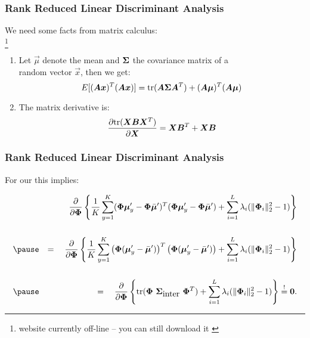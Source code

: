 \begin{frame}
	\frametitle{Rank Reduced Linear Discriminant Analysis \cont}

	We need some facts from matrix calculus: \\
	\point {}%
	\footnote{website currently off-line -- you can still download it \point\href{http://www2.imm.dtu.dk/pubdb/views/publication_details.php?id=3274}{}} \\
	\spread

	\begin{enumerate}
		\item Let $\vec\mu$ denote the mean and ${\bm \Sigma}$ the covariance matrix of a \\
		      random vector $\vec x$, then we get:
		      \begin{displaymath}
			      E[({\bm A} {\bm x})^T({\bm A} {\bm x})] =
			      {\mbox{tr}}({\bm A} {\bm \Sigma} {\bm A}^T) + ({\bm A} {\bm \mu})^T({\bm A}{\bm \mu})
		      \end{displaymath}
		      \pause
		\item The matrix derivative is:
		      \begin{displaymath}
			      \frac{\partial \mbox{tr}( {\bm X} {\bm B} {\bm X}^T)}{\partial {\bm X}} = {\bm X}{\bm B}^T +{\bm X}{\bm B}
		      \end{displaymath}
	\end{enumerate}
\end{frame}


\begin{frame}
	\frametitle{Rank Reduced Linear Discriminant Analysis \cont}

	For our  this implies:

	\begin{eqnarray*}
		& & \frac{\partial}{\partial{\mat{\Phi}}}
		\left\{
		\frac{1}{K} \sum_{y=1}^K (\mat{\Phi} \vec{\mu}'_y - \mat{\Phi} \bar{\vec{\mu}}' )^T
		(\mat{\Phi} \vec{\mu}'_y - \mat{\Phi} \bar{\vec{\mu}}' )  +
		\sum_{i=1}^{L} \lambda_i (\| \mat{\Phi}_i \|^2_2 - 1)
		\right\} \\[.5cm] \pause
		& & = \quad \frac{\partial}{\partial{\mat{\Phi}}}
		\left\{
		\frac{1}{K} \sum_{y=1}^K \left( \mat\Phi (\vec{\mu}'_y - \bar{\vec{\mu}}') \right)^T
		\left( \mat\Phi (\vec{\mu}'_y - \bar{\vec{\mu}}') \right) +
		\sum_{i=1}^{L} \lambda_i (\| \mat {\Phi}_i \|^2_2 - 1)
		\right\} \\[.5cm] \pause
		& & = \quad \frac{\partial}{\partial{\mat{\Phi}}}
		\left\{
		\mbox{tr} (\mat\Phi \ \mat \Sigma_{\mbox{inter}} \ \mat\Phi^T) +
		\sum_{i=1}^{L} \lambda_i (\| \mat {\Phi}_i \|_2^2 - 1)
		\right\}
		\stackrel{!}{=} \mat 0.
	\end{eqnarray*}
\end{frame}


